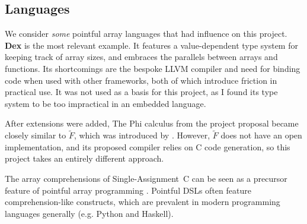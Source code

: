 \subsection{Languages}

We consider \textit{some} pointful array languages that had influence on this project. \textbf{Dex} is the most relevant example. It features a value-dependent type system for keeping track of array sizes, and embraces the parallels between arrays and functions. Its shortcomings are the bespoke LLVM compiler and need for binding code when used with other frameworks, both of which introduce friction in practical use. It was not used as a basis for this project, as I found its type system to be too impractical in an embedded language.

After extensions were added, The Phi calculus from the project proposal became closely similar to $\tilde F$, which was introduced by \textcite{shaikhha2019efficient}. However, $\tilde F$ does not have an open implementation, and its proposed compiler relies on C code generation, so this project takes an entirely different approach. 

The array comprehensions of Single-Assignment~C can be seen as a precursor feature of pointful array programming \cite{scholz1994single}. Pointful DSLs often feature comprehension-like constructs, which are prevalent in modern programming languages generally (e.g. Python and Haskell). 





